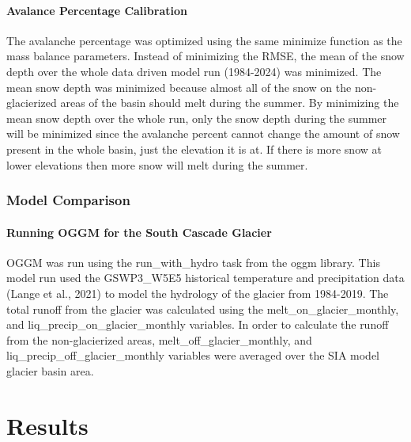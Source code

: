 \documentclass{article}
\begin{document}
\paragraph{Avalance Percentage Calibration}
The avalanche percentage was optimized using the same minimize function as the mass balance parameters. Instead of minimizing the RMSE, the mean of the 
snow depth over the whole data driven model run (1984-2024) was minimized. The mean snow depth was minimized because almost all of the snow on the 
non-glacierized areas of the basin should melt during the summer. By minimizing the mean snow depth over the whole run, only the snow depth during 
the summer will be minimized since the avalanche percent cannot change the amount of snow present in the whole basin, just the elevation it is at. If 
there is more snow at lower elevations then more snow will melt during the summer.

\subsubsection{Model Comparison}
\paragraph{Running OGGM for the South Cascade Glacier}
OGGM was run using the run\_with\_hydro task from the oggm library. This model run used the GSWP3\_W5E5 historical temperature and 
precipitation data (Lange et al., 2021) to model the hydrology of the glacier from 1984-2019. The total runoff from the glacier was calculated 
using the melt\_on\_glacier\_monthly, and liq\_precip\_on\_glacier\_monthly variables. In order 
to calculate the runoff from the non-glacierized areas, \linebreak melt\_off\_glacier\_monthly, and liq\_precip\_off\_glacier\_monthly variables were averaged over the 
SIA model glacier basin area. 

\section{Results}
\end{document}
